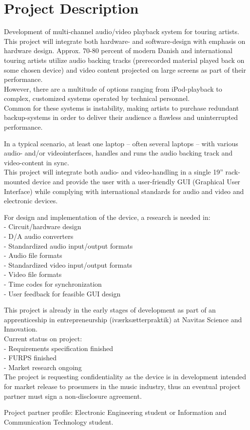 \chapter{Project Description}
Development of multi-channel audio/video playback system for touring artists. This project will
integrate both hardware- and software-design with emphasis on hardware design.
Approx. 70-80 percent of modern Danish and international touring artists utilize audio backing tracks
(prerecorded material played back on some chosen device) and video content projected on large
screens as part of their performance. \\
However, there are a multitude of options ranging from iPod-playback to complex, customized
systems operated by technical personnel. \\
Common for these systems is instability, making artists to purchase redundant backup-systems in
order to deliver their audience a flawless and uninterrupted performance. \newline

In a typical scenario, at least one laptop – often several laptops – with various audio- and/or videointerfaces, handles and runs the audio backing track and video-content in sync. \\
This project will integrate both audio- and video-handling in a single 19” rack-mounted device and
provide the user with a user-friendly GUI (Graphical User Interface) while complying with
international standards for audio and video and electronic devices. \newline

For design and implementation of the device, a research is needed in: \\
- Circuit/hardware design \\
- D/A audio converters \\
- Standardized audio input/output formats \\
- Audio file formats \\
- Standardized video input/output formats \\
- Video file formats \\
- Time codes for synchronization \\
- User feedback for feasible GUI design \newline

This project is already in the early stages of development as part of an apprenticeship in
entrepreneurship (iværksætterpraktik) at Navitas Science and Innovation. \\
Current status on project: \\
- Requirements specification finished \\
- FURPS finished \\
- Market research ongoing \\
The project is requesting confidentiality as the device is in development intended for market release to
prosumers in the music industry, thus an eventual project partner must sign a non-disclosure
agreement. \newline

Project partner profile: Electronic Engineering student or Information and Communication
Technology student.